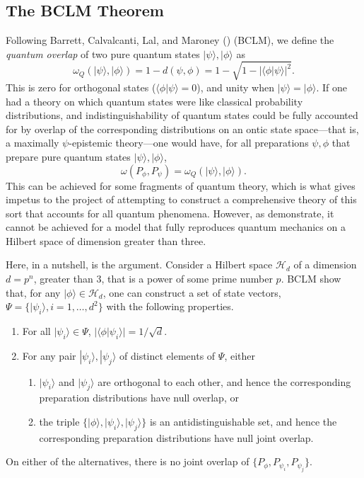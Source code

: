 \documentclass[12pt]{article}
\newcommand{\ket}[1]{|#1\rangle}
\newcommand{\bkt}[2]{\langle#1|#2\rangle}
\newcommand{\mc}{\mathcal}
\begin{document}
\subsection{The BCLM Theorem}  Following Barrett, Calvalcanti, Lal, and Maroney (\citeyear{BCLM}) (BCLM), we define the \emph{quantum overlap} of two pure quantum states $\ket{\psi}, \ket{\phi}$ as
\begin{equation}
\omega_Q(\ket{\psi}, \ket{\phi}) = 1 - d(\psi, \phi) = 1 - \sqrt{1 - |\bkt{\phi}{\psi}|^2}.
\end{equation}
This is zero for orthogonal states ($\bkt{\phi}{\psi} = 0$), and unity when $\ket{\psi} = \ket{\phi}$.  If  one had a theory on which quantum states were like classical probability distributions, and indistinguishability of quantum states could be fully accounted for by overlap of the corresponding distributions on an ontic state space---that is, a maximally $\psi$-epistemic theory---one would have, for all preparations $\psi, \phi$ that prepare pure quantum states $\ket{\psi}, \ket{\phi}$,
\begin{equation}
\omega(P_\phi, P_\psi) = \omega_Q(\ket{\psi}, \ket{\phi}).
\end{equation}
This can be achieved for some fragments of quantum theory, which is what gives impetus to the project of attempting to construct a comprehensive theory of this sort that accounts for all quantum phenomena. However, as \citet{BCLM} demonstrate, it cannot be achieved for a model that fully reproduces quantum mechanics on a Hilbert space of dimension greater than three.

Here, in  a nutshell, is the argument. Consider a Hilbert space $\mc{H}_d$ of a dimension $d = p^n$, greater than 3, that is a power of some prime number $p$.  BCLM show that, for any $\ket{\phi} \in \mc{H}_d$, one can construct a set of state vectors, $\Psi = \{\ket{\psi_i}, i = 1, \ldots, d^2\}$   with the following properties.
\begin{enumerate}[label = \alph*)]
\item For all $\ket{\psi_i} \in \Psi$, $|\bkt{\phi}{\psi_i}| = 1/\sqrt{d}$.
\item For any pair $\ket{\psi_i}, \ket{\psi_j}$ of distinct elements of $\Psi$, either
\begin{enumerate}[label = \roman*)]
\item $\ket{\psi_i}$ and $\ket{\psi_j}$ are orthogonal to each other, and hence the corresponding preparation distributions have null overlap, or
\item the triple $\{ \ket{\phi}, \ket{\psi_i}, \ket{\psi_j} \}$ is an antidistinguishable set, and hence the corresponding preparation distributions have null joint overlap.
\end{enumerate}
\end{enumerate}
On either of the alternatives, there is no joint overlap of $\{P_\phi, P_{\psi_i}, P_{\psi_j}\}$.
\end{document}
